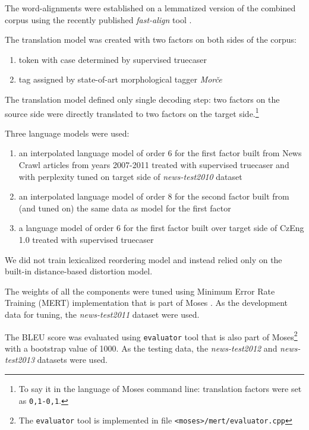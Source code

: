 The word-alignments were established on a lemmatized version of the combined corpus using
the recently published \emph{fast-align} tool \citep{dyer:fastalign}.

The translation model was created with two factors on both sides of the corpus:
\begin{enumerate}
  \item token with case determined by supervised truecaser
  \item tag assigned by state-of-art morphological tagger \emph{Morče}
\end{enumerate}

The translation model defined only single decoding step: two factors on the source side
were directly translated to two factors on the target side.\footnote{To say it in the language
of Moses command line: translation factors were set as \texttt{0,1-0,1}.}

Three language models were used:
\begin{enumerate}
  \item an interpolated language model of order 6 for the first factor built from News Crawl
    articles from years 2007-2011 treated with supervised truecaser and with perplexity tuned
    on target side of \emph{news-test2010} dataset
  \item an interpolated language model of order 8 for the second factor built from (and tuned
    on) the same data as model for the first factor
  \item a language model of order 6 for the first factor built over target side of CzEng 1.0
    treated with supervised truecaser
\end{enumerate}

We did not train lexicalized reordering model and instead relied only on the built-in
distance-based distortion model.

The weights of all the components were tuned using Minimum Error Rate Training (MERT)
implementation that is part of Moses \citep{bertoldi:mert}.
As the development data for tuning, the \emph{news-test2011} dataset were used.

The BLEU score was evaluated using \texttt{evaluator} tool that is also part of Moses\footnote{The \texttt{evaluator}
tool is implemented in file \texttt{<moses>/mert/evaluator.cpp}} with a bootstrap value of 1000.
As the testing data, the \emph{news-test2012} and \emph{news-test2013} datasets were used.

